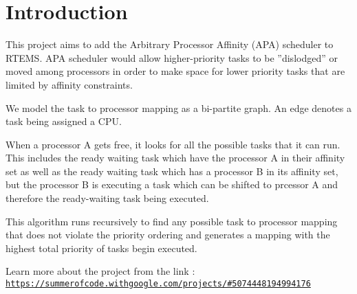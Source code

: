 \hypertarget{index_Introduction}{}\section{Introduction}\label{index_Introduction}
This project aims to add the Arbitrary Processor Affinity (A\+PA) scheduler to R\+T\+E\+MS. A\+PA scheduler would allow higher-\/priority tasks to be ”dislodged” or moved among processors in order to make space for lower priority tasks that are limited by affinity constraints.

We model the task to processor mapping as a bi-\/partite graph. An edge denotes a task being assigned a C\+PU.

When a processor A gets free, it looks for all the possible tasks that it can run. This includes the ready waiting task which have the processor A in their affinity set as well as the ready waiting task which has a processor B in its affinity set, but the processor B is executing a task which can be shifted to prcessor A and therefore the ready-\/waiting task being executed.

This algorithm runs recursively to find any possible task to processor mapping that does not violate the priority ordering and generates a mapping with the highest total priority of tasks begin executed.

Learn more about the project from the link \+: \href{https://summerofcode.withgoogle.com/projects/#5074448194994176}{\tt https\+://summerofcode.\+withgoogle.\+com/projects/\#5074448194994176} 
